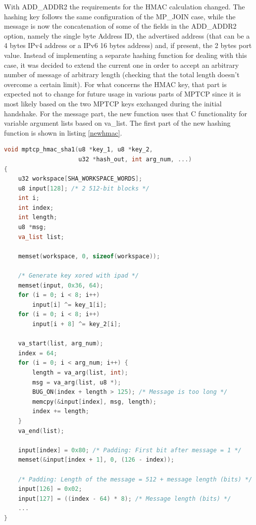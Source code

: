 With ADD\_ADDR2 the requirements for the HMAC calculation changed. The hashing key follows the same configuration of the MP\_JOIN case, while the message is now the concatenation of some of the fields in the ADD\_ADDR2 option, namely the single byte Address ID, the advertised address (that can be a 4 bytes IPv4 address or a IPv6 16 bytes address) and, if present, the 2 bytes port value. Instead of implementing a separate hashing function for dealing with this case,  it was decided to extend the current one in order to accept an arbitrary number of message of arbitrary length (checking that the total length doesn't overcome a certain limit). For what concerns the HMAC key, that part is expected not to change for future usage in various parts of MPTCP since it is most likely based on the two MPTCP keys exchanged during the initial handshake. For the message part, the new function uses that C functionality for variable argument lists based on va\_list. The first part of the new hashing function is shown in listing \ref{newhmac}.

\begin{lstlisting}[language=c, caption=\textit{Implementation for the new \textit{mptcp\_hmac\_sha1() function (first part)}}, label=newhmac]
void mptcp_hmac_sha1(u8 *key_1, u8 *key_2, 
                     u32 *hash_out, int arg_num, ...)
{
    u32 workspace[SHA_WORKSPACE_WORDS];
	u8 input[128]; /* 2 512-bit blocks */
	int i;
	int index;
	int length;
	u8 *msg;
	va_list list;

	memset(workspace, 0, sizeof(workspace));

	/* Generate key xored with ipad */
	memset(input, 0x36, 64);
	for (i = 0; i < 8; i++)
		input[i] ^= key_1[i];
	for (i = 0; i < 8; i++)
		input[i + 8] ^= key_2[i];

	va_start(list, arg_num);
	index = 64;
	for (i = 0; i < arg_num; i++) {
		length = va_arg(list, int);
		msg = va_arg(list, u8 *);
		BUG_ON(index + length > 125); /* Message is too long */
		memcpy(&input[index], msg, length);
		index += length;
	}
	va_end(list);

	input[index] = 0x80; /* Padding: First bit after message = 1 */
	memset(&input[index + 1], 0, (126 - index));

	/* Padding: Length of the message = 512 + message length (bits) */
	input[126] = 0x02;
	input[127] = ((index - 64) * 8); /* Message length (bits) */
	...
}
\end{lstlisting}

